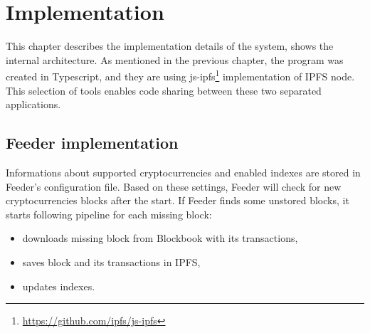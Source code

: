 




\chapter{Implementation}
\label{Implementation}
This chapter describes the implementation details of the system, shows the internal
architecture. As mentioned in the previous chapter, the program was created in Typescript, and they are using js-ipfs\footnote{\url{https://github.com/ipfs/js-ipfs}} implementation of IPFS node. This selection of tools enables code sharing between these two separated applications.

\section{Feeder implementation}
Informations about supported cryptocurrencies and enabled indexes are stored in Feeder's configuration file. Based on these settings, Feeder will check for new cryptocurrencies blocks after the start. If Feeder finds some unstored blocks, it starts following pipeline for each missing block:
\begin{itemize}
    \item downloads missing block from Blockbook with its transactions,
    \item saves block and its transactions in IPFS,
    \item updates indexes.
\end{itemize}


